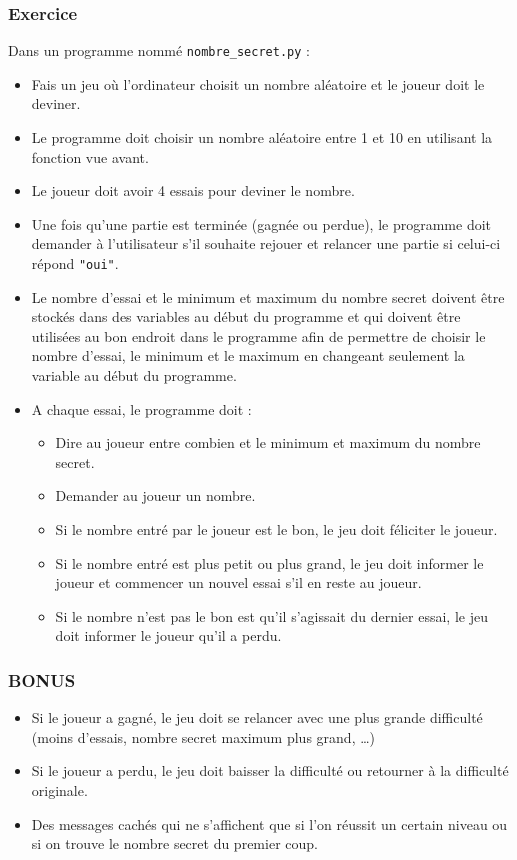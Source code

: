 \documentclass[11pt]{article}
\begin{document}
\subsubsection*{Exercice}
\label{sec:org07900f5}
Dans un programme nommé \texttt{nombre\_secret.py} :
\begin{itemize}
\item Fais un jeu où l'ordinateur choisit un nombre aléatoire et le joueur doit le deviner.
\item Le programme doit choisir un nombre aléatoire entre 1 et 10 en utilisant la fonction vue avant.
\item Le joueur doit avoir 4 essais pour deviner le nombre.
\item Une fois qu'une partie est terminée (gagnée ou perdue), le programme doit demander à l'utilisateur s'il souhaite rejouer et relancer une partie si celui-ci répond \texttt{"oui"}.
\item Le nombre d'essai et le minimum et maximum du nombre secret doivent être stockés dans des variables au début du programme et qui doivent être utilisées au bon endroit dans le programme afin de permettre de choisir le nombre d'essai, le minimum et le maximum en changeant seulement la variable au début du programme.
\item A chaque essai, le programme doit :
\begin{itemize}
\item Dire au joueur entre combien et le minimum et maximum du nombre secret.
\item Demander au joueur un nombre.
\item Si le nombre entré par le joueur est le bon, le jeu doit féliciter le joueur.
\item Si le nombre entré est plus petit ou plus grand, le jeu doit informer le joueur et commencer un nouvel essai s'il en reste au joueur.
\item Si le nombre n'est pas le bon est qu'il s'agissait du dernier essai, le jeu doit informer le joueur qu'il a perdu.
\end{itemize}
\end{itemize}

\subsubsection*{BONUS}
\label{sec:org4491ef6}
\begin{itemize}
\item Si le joueur a gagné, le jeu doit se relancer avec une plus grande difficulté (moins d'essais, nombre secret maximum plus grand, \ldots{})
\item Si le joueur a perdu, le jeu doit baisser la difficulté ou retourner à la difficulté originale.
\item Des messages cachés qui ne s'affichent que si l'on réussit un certain niveau ou si on trouve le nombre secret du premier coup.
\end{itemize}
\end{document}
